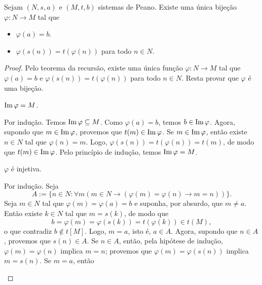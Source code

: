 \begin{theorem} \label{teo.set:isomorfismo_sistemas_peano} 
    Sejam $(N, s, a)$ e $(M, t, b)$ sistemas de Peano. Existe uma única bijeção $\varphi : N \to M$ tal que
        \begin{itemize}
            \item $\varphi(a) = b$.
            \item $\varphi(s(n)) = t(\varphi(n))$ para todo $n \in N$.
        \end{itemize}
\end{theorem}

\begin{proof} 
    Pelo teorema da recursão, existe uma única função $\varphi : N \to M$ tal que $\varphi(a) = b$ e $\varphi(s(n)) = t(\varphi(n))$ para todo $n \in N$. Resta provar que $\varphi$ é uma bijeção.
        \begin{claim}
            $\operatorname{Im} \varphi = M$.
        \end{claim}
        \begin{midproof}
            Por indução. Temos $\operatorname{Im} \varphi \subseteq M$. Como $\varphi(a) = b$, temos $b \in \operatorname{Im} \varphi$. Agora, supondo que $m \in \operatorname{Im} \varphi$, provemos que $t(m) \in \operatorname{Im} \varphi$. Se $m \in \operatorname{Im} \varphi$, então existe $n \in N$ tal que $\varphi(n) = m$. Logo, $\varphi(s(n)) = t(\varphi(n)) = t(m)$, de modo que $t(m) \in \operatorname{Im} \varphi$. Pelo princípio de indução, temos $\operatorname{Im} \varphi = M$. \whiteproof
        \end{midproof}
        \begin{claim}
            $\varphi$ é injetiva.
        \end{claim}
        \begin{midproof}
            Por indução. Seja
                \[
                    A := \{n \in N : \forall m (m \in N \rightarrow (\varphi(m) = \varphi(n) \rightarrow m=n)) \}.
                \]
            Seja $m \in N$ tal que $\varphi(m) = \varphi(a) = b$ e suponha, por absurdo, que $m \neq a$. Então existe $k \in N$ tal que $m = s(k)$, de modo que
                \[
                    b = \varphi(m) = \varphi(s(k)) = t(\varphi(k)) \in t(M),
                \]
            o que contradiz $b \notin t[M]$. Logo, $m=a$, isto é, $a \in A$. Agora, supondo que $n \in A$, provemos que $s(n) \in A$. Se $n \in A$, então, pela hipótese de indução, $\varphi(m) = \varphi(n)$ implica $m=n$; provemos que $\varphi(m) = \varphi(s(n))$ implica $m = s(n)$. Se $m=a$, então
                \[
\]
\end{midproof}
\end{proof}
